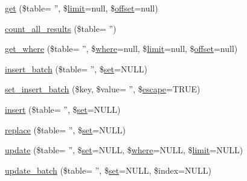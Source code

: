 \begin{DoxyCompactItemize}
\item 
\hyperlink{class_c_i___d_b__active__record_adcee0a9d1d395fd4d3b41c4b8db7e6e9}{get} (\$table= '', \$\hyperlink{class_c_i___d_b__active__record_a7514ed2c519255f6ad52366ff2157b4a}{limit}=null, \$\hyperlink{class_c_i___d_b__active__record_afd31b65425a2b5cf30711bf29e1b1851}{offset}=null)
\item 
\hyperlink{class_c_i___d_b__active__record_a52e1ce5849c8339c0e0deb2dd0d820f5}{count\-\_\-all\-\_\-results} (\$table= '')
\item 
\hyperlink{class_c_i___d_b__active__record_a64f276196101afd426b56b7cece7dde3}{get\-\_\-where} (\$table= '', \$\hyperlink{class_c_i___d_b__active__record_a7519d8b5035bdb081e1e7d9cc7c716fb}{where}=null, \$\hyperlink{class_c_i___d_b__active__record_a7514ed2c519255f6ad52366ff2157b4a}{limit}=null, \$\hyperlink{class_c_i___d_b__active__record_afd31b65425a2b5cf30711bf29e1b1851}{offset}=null)
\item 
\hyperlink{class_c_i___d_b__active__record_a5e097f5526844f12b1d4779bb3c97c69}{insert\-\_\-batch} (\$table= '', \$\hyperlink{class_c_i___d_b__active__record_a0c43d8d98db94a956f172035ed147d55}{set}=N\-U\-L\-L)
\item 
\hyperlink{class_c_i___d_b__active__record_aa6a14a96c2f2b6e5f761aaf18bf8c14e}{set\-\_\-insert\-\_\-batch} (\$key, \$value= '', \$\hyperlink{class_c_i___d_b__driver_ac8f37ca5703d4558c732e692194f8cd6}{escape}=T\-R\-U\-E)
\item 
\hyperlink{class_c_i___d_b__active__record_ac354a4a5bc07f519085230be00b3545c}{insert} (\$table= '', \$\hyperlink{class_c_i___d_b__active__record_a0c43d8d98db94a956f172035ed147d55}{set}=N\-U\-L\-L)
\item 
\hyperlink{class_c_i___d_b__active__record_a71a4809228dce3974013c0db36a5f281}{replace} (\$table= '', \$\hyperlink{class_c_i___d_b__active__record_a0c43d8d98db94a956f172035ed147d55}{set}=N\-U\-L\-L)
\item 
\hyperlink{class_c_i___d_b__active__record_a7f1bcfcca3cb9fe450f21737028040a7}{update} (\$table= '', \$\hyperlink{class_c_i___d_b__active__record_a0c43d8d98db94a956f172035ed147d55}{set}=N\-U\-L\-L, \$\hyperlink{class_c_i___d_b__active__record_a7519d8b5035bdb081e1e7d9cc7c716fb}{where}=N\-U\-L\-L, \$\hyperlink{class_c_i___d_b__active__record_a7514ed2c519255f6ad52366ff2157b4a}{limit}=N\-U\-L\-L)
\item 
\hyperlink{class_c_i___d_b__active__record_a3a7d52e50b609117b3ca44a4dfeca263}{update\-\_\-batch} (\$table= '', \$\hyperlink{class_c_i___d_b__active__record_a0c43d8d98db94a956f172035ed147d55}{set}=N\-U\-L\-L, \$index=N\-U\-L\-L)

\end{DoxyCompactItemize}
